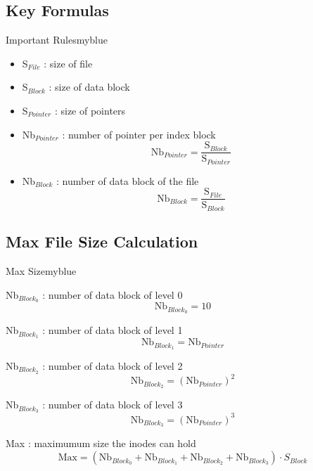 \vspace{1cm}

\subsection{Key Formulas}
\begin{prettyBox}{Important Rules}{myblue}
\begin{itemize}
    \item S$_{File}$ : size of file
    \item S$_{Block}$ : size of data block
    \item S$_{Pointer}$ : size of pointers
    \item Nb$_{Pointer}$ : number of pointer per index block
        \[\text{Nb}_{Pointer} = \frac{\text{S$_{Block}$}}{\text{S$_{Pointer}$}}\]
    \item Nb$_{Block}$ : number of data block of the file
    \[\text{Nb}_{Block} = \frac{\text{S$_{File}$}}{\text{S$_{Block}$}}\]
\end{itemize}
\end{prettyBox}

\newpage
\null

\subsection{Max File Size Calculation}
\begin{prettyBox}{Max Size}{myblue}
\item Nb$_{Block_0}$ : number of data block of level 0 
    \[\text{Nb}_{Block_0} = 10\]
\item Nb$_{Block_1}$ : number of data block of level 1 
    \[ \text{Nb}_{Block_1} = \text{Nb}_{Pointer}\]
\item Nb$_{Block_2}$ : number of data block of level 2 
    \[ \text{Nb}_{Block_2} = (\text{Nb}_{Pointer})^2\]
\item Nb$_{Block_3}$ : number of data block of level 3 
    \[ \text{Nb}_{Block_3} = (\text{Nb}_{Pointer})^3\]
\item Max : maximumum size the inodes can hold
    \[\text{Max} = ( \text{Nb}_{Block_0} + \text{Nb}_{Block_1} + \text{Nb}_{Block_2} + \text{Nb}_{Block_3})\cdot 
    S_{Block}\]
\end{prettyBox}



\vspace{0.65cm}

